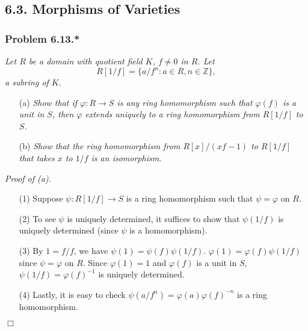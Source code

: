 \documentclass{article}
\begin{document}



\subsection*{6.3. Morphisms of Varieties \\}



\subsubsection*{Problem 6.13.*}
\emph{Let $R$ be a domain with quotient field $K$, $f \neq 0$ in $R$.
Let
\[
  R[1/f] = \{ a/f^n : a \in R, n \in \mathbb{Z} \},
\]
a subring of $K$.}
\begin{enumerate}
\item[(a)]
  \emph{Show that if $\varphi: R \to S$ is any ring homomorphism such that
  $\varphi(f)$ is a unit in $S$,
  then $\varphi$ extends uniquely to a ring homomorphism from $R[1/f]$ to $S$.}

\item[(b)]
  \emph{Show that the ring homomorphism from $R[x]/(xf-1)$ to $R[1/f]$ that
  takes $x$ to $1/f$ is an isomorphism.} \\
\end{enumerate}



\emph{Proof of (a).}
\begin{enumerate}
\item[(1)]
  Suppose $\psi: R[1/f] \to S$ is a ring homomorphism such that $\psi = \varphi$ on $R$.

\item[(2)]
  To see $\psi$ is uniquely determined,
  it suffices to show that $\psi(1/f)$ is uniquely determined
  (since $\psi$ is a homomorphism).

\item[(3)]
  By $1 = f/f$, we have $\psi(1) = \psi(f)\psi(1/f)$.
  $\varphi(1) = \varphi(f)\psi(1/f)$ since $\psi = \varphi$ on $R$.
  Since $\varphi(1) = 1$ and $\varphi(f)$ is a unit in $S$,
  $\psi(1/f) = \varphi(f)^{-1}$ is uniquely determined.

\item[(4)]
  Lastly,
  it is easy to check $\psi(a/f^n) = \varphi(a) \varphi(f)^{-n}$ is a ring homomorphism.
\end{enumerate}
$\Box$ \\
\end{document}
